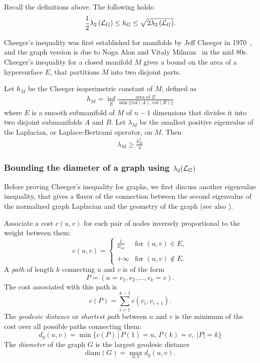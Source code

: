 \begin{theorem}\label{thm:cheegerinequality}
Recall the definitions above. The following holds:
\[
\frac12\lambda_2\left(\mathcal{L}_G\right) \leq h_G \leq \sqrt{2\lambda_2\left(\mathcal{L}_G\right)}.
\]
\end{theorem}

Cheeger's inequality was first established for manifolds by Jeff Cheeger in 1970~\cite{JCheeger_1970}, and the graph version is due to Noga Alon and Vitaly Milman~\cite{NAlon_1986,NAlon_VMilman_1986} in the mid 80s. 
Cheeger's inequality for a closed manifold $M$ gives a bound on the area of a hypersurface $E$, that partitions $M$ into two disjoint parts.
\begin{theorem}
Let $h_M$ be the Cheeger isoperimetric constant of $M$, defined as
\begin{eqnarray*}
h_M = \inf_{E}	\frac	{\text{area of $E$}}	{\min\{\text{vol}(A),\text{vol}(B)\}}
\end{eqnarray*}
where $E$ is a smooth submanifold of $M$ of $n-1$ dimensions that divides it into two disjoint submanifolds $A$ and $B$.
Let $\lambda_M$ be the smallest positive eigenvalue of the Laplacian, or Laplace-Bertrami operator, on $M$.
Then
\begin{eqnarray*}
\lambda_M \geq \frac{h_M^2}{4}
\end{eqnarray*}
\end{theorem}


\subsubsection{Bounding the diameter of a graph using $\lambda_2(\mathcal{L}_G)$}
Before proving Cheeger's inequality for graphs, we first discuss another eigenvalue inequality, that gives a flavor of the connection between the second eigenvalue of the normalized graph Laplacian and the geometry of the graph (see also \cite{FanChung_SpectralGraphTheory}). 

Associate a cost $c(u,v)$ for each pair of nodes inversely proportional to the weight between them:
\begin{equation}
c(u,v) = \left\{\begin{array}{cc}
                  \frac{1}{w_{uv}} & \text{for } (u,v)\in E, \\ & \\
                  +\infty & \text{for } (u,v)\notin E.
                \end{array}
 \right.
\end{equation}
A {\em path} of length $k$ connecting $u$ and $v$ is of the form
$$P = (u=v_1,v_2,\ldots,v_k=v).$$
The cost associated with this path is
$$c(P) = \sum_{i=1}^{k-1} c(v_i,v_{i+1}).$$
The {\em geodesic distance} or {\em shortest path} between $u$ and $v$ is the minimum of the cost over all possible paths connecting them:
$$d_g(u,v) = \min \{c(P) \,| \, P(1)=u,\, P(k)=v,\; |P|=k\}$$
The {\em diameter} of the graph $G$ is the largest geodesic distance
$$\text{diam}(G) = \max_{u,v} d_g(u,v).$$

